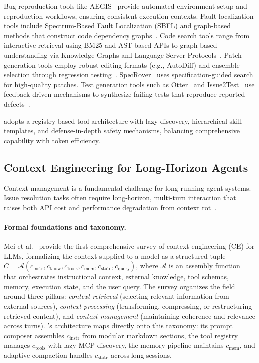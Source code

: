 Bug reproduction tools like AEGIS~\cite{aegis} provide automated environment setup and reproduction workflows, ensuring consistent execution contexts. Fault localization tools include Spectrum-Based Fault Localization (SBFL) and graph-based methods that construct code dependency graphs~\cite{issue_resolution_survey}. Code search tools range from interactive retrieval using BM25 and AST-based APIs to graph-based understanding via Knowledge Graphs and Language Server Protocols~\cite{microsoft2016lsp, issue_resolution_survey}. Patch generation tools employ robust editing formats (e.g., AutoDiff) and ensemble selection through regression testing~\cite{issue_resolution_survey}. SpecRover~\cite{specrover} uses specification-guided search for high-quality patches. Test generation tools such as Otter~\cite{otter} and Issue2Test~\cite{issue2test} use feedback-driven mechanisms to synthesize failing tests that reproduce reported defects~\cite{issue_resolution_survey}.

\name adopts a registry-based tool architecture with lazy discovery, hierarchical skill templates, and defense-in-depth safety mechanisms, balancing comprehensive capability with token efficiency.

\subsection{Context Engineering for Long-Horizon Agents}
Context management is a fundamental challenge for long-running agent systems. Issue resolution tasks often require long-horizon, multi-turn interaction that raises both API cost and performance degradation from context rot~\cite{issue_resolution_survey}.

\paragraph{Formal foundations and taxonomy.} Mei et al.~\cite{mei2025survey} provide the first comprehensive survey of context engineering (CE) for LLMs, formalizing the context supplied to a model as a structured tuple $C = \mathcal{A}(c_{\text{instr}}, c_{\text{know}}, c_{\text{tools}}, c_{\text{mem}}, c_{\text{state}}, c_{\text{query}})$, where $\mathcal{A}$ is an assembly function that orchestrates instructional context, external knowledge, tool schemas, memory, execution state, and the user query. The survey organizes the field around three pillars: \emph{context retrieval} (selecting relevant information from external sources), \emph{context processing} (transforming, compressing, or restructuring retrieved content), and \emph{context management} (maintaining coherence and relevance across turns). \name's architecture maps directly onto this taxonomy: its prompt composer assembles $c_{\text{instr}}$ from modular markdown sections, the tool registry manages $c_{\text{tools}}$ with lazy MCP discovery, the memory pipeline maintains $c_{\text{mem}}$, and adaptive compaction handles $c_{\text{state}}$ across long sessions.

